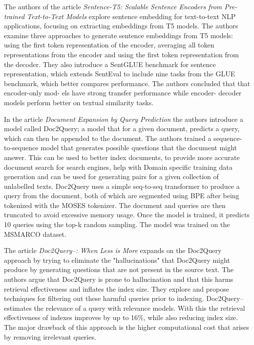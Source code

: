 \documentclass[fleqn,moreauthors,10pt]{ds_report}
\begin{document}
The authors of the article \textit{Sentence-T5: Scalable Sentence Encoders
from Pre-trained Text-to-Text Models}\cite{ni2021sentencet5} explore sentence embedding for text-to-text NLP applications, focusing on extracting embeddings from T5 models. The authors examine three approaches to generate sentence embeddings from T5 models: using the first token representation of the encoder, averaging all token representations from the encoder and using the first token representation from the decoder. They also introduce a SentGLUE benchmark for sentence representation, which extends SentEval to include nine tasks from the GLUE benchmark, which better compares performance. The authors concluded that that encoder-only mod-
els have strong transfer performance while encoder-
decoder models perform better on textual similarity
tasks.

In the article \textit{Document Expansion by Query Prediction}\cite{DBLP:journals/corr/abs-1904-08375} the authors introduce a model called Doc2Query; a model that for a given document, predicts a query, which can then be appended to the document. The authors trained a sequence-to-sequence model that generates possible questions that the document might answer. This can be used to better index documents, to provide more accurate document search for search engines, help with Domain specific training data generation and can be used for generating pairs for a given collection of unlabelled texts. Doc2Query uses a simple seq-to-seq transformer to produce a query from the document, both of which are segmented using BPE\cite{sennrich2016neural} after being tokenized with the MOSES tokenizer. The document and queries are then truncated to avoid excessive memory usage. Once the model is trained, it predicts 10 queries using the top-k random sampling. The model was trained on the MSMARCO\cite{DBLP:journals/corr/NguyenRSGTMD16} dataset.

The article \textit{Doc2Query--: When Less is More}\cite{gospodinov2023doc2query} expands on the Doc2Query approach by trying to eliminate the "hallucinations" that Doc2Query might produce by generating questions that are not present in the source text. The authors argue that Doc2Query is prone to hallucination and that this harms retrieval effectiveness and inflates the index size. They explore and propose techniques for filtering out these harmful queries prior to indexing. Doc2Query-- estimates the relevance of a query with relevance models. With this the retrieval effectiveness of indexes improves by up to 16\%, while also reducing index size. The major drawback of this approach is the higher computational cost that arises by removing irrelevant queries.
\end{document}
